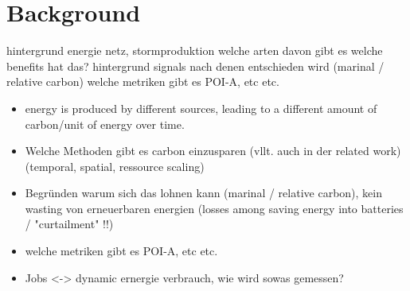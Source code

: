 \chapter{Background}

hintergrund energie netz, stormproduktion
welche arten davon gibt es 
welche benefits hat das?
hintergrund signals nach denen entschieden wird (marinal / relative carbon)
welche metriken gibt es POI-A, etc etc.
\begin{itemize}
    \item energy is produced by different sources, leading to a different amount of carbon/unit of energy over time. 
    \item Welche Methoden gibt es carbon einzusparen (vllt. auch in der related work) (temporal, spatial, ressource scaling)
    \item Begründen warum sich das lohnen kann (marinal / relative carbon), kein wasting von erneuerbaren energien (losses among saving energy into batteries / "curtailment" !!)
    \item welche metriken gibt es POI-A, etc etc.
    \item Jobs <-> dynamic ernergie verbrauch, wie wird sowas gemessen?
\end{itemize}